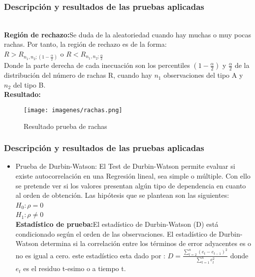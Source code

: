 \documentclass[12pt]{beamer}
\begin{document}
\begin{frame}
\frametitle{Descripción y resultados de las pruebas aplicadas}
~\\ \textbf{Región de rechazo:}Se duda de la aleatoriedad cuando hay muchas o muy pocas rachas. Por tanto, la región de rechazo es de la forma:
~\\ $R>R_{n_{1},n_{2};(1-\frac{\alpha}{2})}$ o $R<R_{n_{1},n_{2};\frac{\alpha}{2}}$
~\\Donde la parte derecha de cada inecuación son los percentiles $(1-\frac{\alpha}{2})$ y $\frac{\alpha}{2}$ de la distribución del número de rachas R, cuando hay $n_{1}$ observaciones del tipo A y $n_{2}$ del tipo B.
~\\ \textbf{Resultado:}
\begin{figure}[!h]
    \begin{center}
        \texttt{[image: imagenes/rachas.png]}
        \caption{Resultado prueba de rachas}
        \label{fig:Densidad}
    \end{center}
\end{figure}
\end{frame}

\begin{frame}
\frametitle{Descripción y resultados de las pruebas aplicadas}
\begin{itemize}
\item Prueba de Durbin-Watson: El Test de Durbin-Watson permite evaluar si existe autocorrelación en una Regresión lineal, sea simple o múltiple. Con ello se pretende ver si los valores presentan algún tipo de dependencia en cuanto al orden de obtención. Las hipótesis que se plantean son las siguientes:
~\\$H_{0}:\rho=0$
~\\$H_{1}:\rho\neq 0$
~\\ \textbf{Estadístico de prueba:}El estadístico de Durbin-Watson (D) está condicionado según el orden de las observaciones. El estadístico de Durbin-Watson determina si la correlación entre los términos de error adyacentes es o no es igual a cero. este estadístico esta dado por : $D=\frac{\sum\limits_{t=2}^{n}(e_{t}-e_{t-1})^2}{\sum\limits_{t=1}^{n}e_{t}^2}$ donde $e_{t}$ es el residuo t-esimo o a tiempo t.
\end{itemize}
\end{frame}
\end{document}
